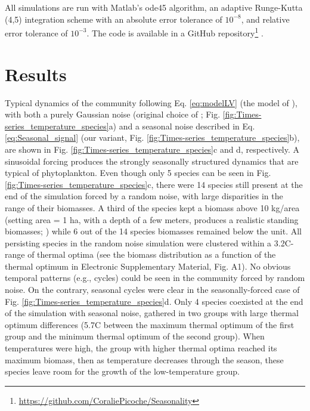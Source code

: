 \documentclass[a4paper,12pt]{article}
\begin{document}
All simulations are run with Matlab's ode45 algorithm, an adaptive
Runge-Kutta (4,5) integration scheme with an absolute error tolerance
of $10^{-8}$, and relative error tolerance of $10^{-3}$. The code
is available in a GitHub repository\footnote{\url{https://github.com/CoraliePicoche/Seasonality}}
.

\section{Results}

Typical dynamics of the community following Eq. \ref{eq:modelLV}
(the model of \citealp{scranton_coexistence_2016}), with both a purely
Gaussian noise (original choice of \citealp{scranton_coexistence_2016};
Fig. \ref{fig:Times-series_temperature_species}a) and a seasonal
noise described in Eq. \ref{eq:Seasonal_signal} (our variant, Fig.
\ref{fig:Times-series_temperature_species}b), are shown in Fig. \ref{fig:Times-series_temperature_species}c
and d, respectively. A sinusoidal forcing produces the strongly seasonally
structured dynamics that are typical of phytoplankton. Even though
only 5 species can be seen in Fig. \ref{fig:Times-series_temperature_species}c,
there were 14 species still present at the end of the simulation forced
by a random noise, with large disparities in the range of their biomasses.
A third of the species kept a biomass above 10 kg/area (setting area
= 1 ha, with a depth of a few meters, produces a realistic standing
biomasses; \citealp{reynolds2006ecology}) while 6 out of the 14 species
biomasses remained below the unit. All persisting species in the random
noise simulation were clustered within a 3.2\textdegree C-range of thermal optima
(see the biomass distribution as a function of the thermal optimum
in Electronic Supplementary Material, Fig. A1). No obvious temporal
patterns (e.g., cycles) could be seen in the community forced by random
noise. On the contrary, seasonal cycles were clear in the seasonally-forced
case of Fig. \ref{fig:Times-series_temperature_species}d. Only 4
species coexisted at the end of the simulation with seasonal noise,
gathered in two groups with large thermal optimum differences (5.7\textdegree C
between the maximum thermal optimum of the first group and the minimum
thermal optimum of the second group). When temperatures were high,
the group with higher thermal optima reached its maximum biomass,
then as temperature decreases through the season, these species leave
room for the growth of the low-temperature group.
\end{document}

